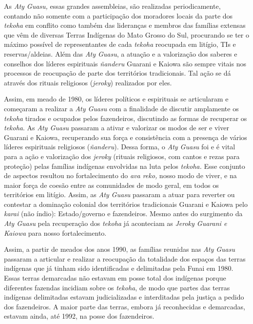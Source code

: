 As \emph{Aty Guasu,} essas grandes assembleias, são realizadas
periodicamente, contando não somente com a participação dos moradores
locais da parte dos \emph{tekoha} em conflito como também das lideranças
e membros das famílias extensas que vêm de diversas Terras Indígenas do
Mato Grosso do Sul, procurando se ter o máximo possível de
representantes de cada \emph{tekoha} reocupada em litígio, TIs e
reservas/aldeias. Além das \emph{Aty Guasu}, a atuação e a valorização
dos saberes e conselhos dos líderes espirituais \emph{ñanderu} Guarani e
Kaiowa são sempre vitais nos processos de reocupação de parte dos
territórios tradicionais. Tal ação se dá através dos rituais religiosos
(\emph{jeroky}) realizados por eles.

Assim, em meado de 1980, os líderes políticos e espirituais se
articularam e começaram a realizar a \emph{Aty Guasu} com a finalidade
de discutir amplamente os \emph{tekoha} tirados e ocupados pelos
fazendeiros, discutindo as formas de recuperar os \emph{tekoha}. As
\emph{Aty Guasu} passaram a ativar e valorizar os modos de ser e viver
Guarani e Kaiowa, recuperando sua força e consistência com a presença de
vários líderes espirituais religiosos (\emph{ñanderu}). Dessa forma, o
\emph{Aty Guasu} foi e é vital para a ação e valorização dos
\emph{jeroky} (rituais religiosos, com cantos e rezas para proteção)
pelas famílias indígenas envolvidas na luta pelos \emph{tekoha.} Esse
conjunto de aspectos resultou no fortalecimento do \emph{ava reko,}
nosso modo de viver, e na maior força de coesão entre as comunidades de
modo geral, em todos os territórios em litígio. Assim, as \emph{Aty
Guasu} passaram a atuar para reverter ou contestar a dominação colonial
dos territórios tradicionais Guarani e Kaiowa pelo \emph{karai} (não
índio): Estado/governo e fazendeiros. Mesmo antes do surgimento da
\emph{Aty Guasu} pela recuperação dos \emph{tekoha} já aconteciam as
\emph{Jeroky Guarani e Kaiowa} para nosso fortalecimento.

Assim, a partir de meados dos anos 1990, as famílias reunidas nas
\emph{Aty Guasu} passaram a articular e realizar a reocupação da
totalidade dos espaços das terras indígenas que já tinham sido
identificadas e delimitadas pela Funai em 1980. Essas terras demarcadas
não estavam em posse total dos indígenas porque diferentes fazendas
incidiam sobre os \emph{tekoha}, de modo que partes das terras indígenas
delimitadas estavam judicializadas e interditadas pela justiça a pedido
dos fazendeiros. A maior parte das terras, embora já reconhecidas e
demarcadas, estavam ainda, até 1992, na posse dos fazendeiros.

